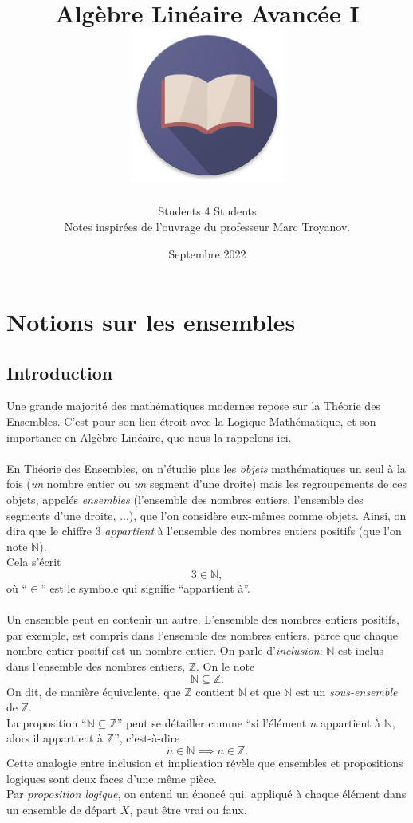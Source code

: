 \documentclass[oneside,12pt,french,table]{book}
\title{
    Algèbre Linéaire Avancée I \\ \vspace{0.5cm}
    \includegraphics[scale=0.5]{assets/imgs/S4S_logo.png}
}
\author{Students 4 Students \\
Notes inspirées de l'ouvrage du professeur Marc Troyanov.}
\date{Septembre 2022}
\theoremstyle{definition}
\theoremstyle{definition}
\theoremstyle{definition}
\begin{document}
\maketitle
\tableofcontents

\chapter{Notions sur les  ensembles}
\section{Introduction}
Une grande majorité des mathématiques modernes repose sur la Théorie des Ensembles. C'est pour son lien étroit avec la Logique Mathématique, et son importance en Algèbre Linéaire, que nous la rappelons ici. \\
\\
En Théorie des Ensembles, on n'étudie plus les \textit{objets} mathématiques un seul à la fois (\textit{un} nombre entier ou \textit{un} segment d'une droite) mais les regroupements de ces objets, appelés \textit{ensembles} (l'ensemble des nombres entiers, l'ensemble des segments d'une droite, ...), que l'on considère eux-mêmes comme objets. Ainsi, on dira que le chiffre 3 \textit{appartient} à l'ensemble des nombres entiers positifs (que l'on note $\mathbb{N}$). \\
Cela s'écrit $$3 \in \mathbb{N},$$
où ``$\in$'' est le symbole qui signifie ``appartient à''. \\
\\
Un ensemble peut en contenir un autre. L'ensemble des nombres entiers positifs, par exemple, est compris dans l'ensemble des nombres entiers, parce que chaque nombre entier positif est un nombre entier. On parle d'\textit{inclusion}: $\mathbb{N}$ est inclus dans l'ensemble des nombres entiers, $\mathbb{Z}$. On le note
$$\mathbb{N} \subseteq \mathbb{Z}.$$
On dit, de manière équivalente, que $\mathbb{Z}$ contient $\mathbb{N}$ et que $\mathbb{N}$ est un \textit{sous-ensemble} de $\mathbb{Z}$.\\ La proposition ``$\mathbb{N} \subseteq \mathbb{Z}$'' peut se détailler comme ``si l'élément $n$ appartient à $\mathbb{N}$, alors il appartient à $\mathbb{Z}$'', c'est-à-dire $$n \in \mathbb{N} \implies n \in \mathbb{Z}.$$
Cette analogie entre inclusion et implication révèle que ensembles et propositions logiques sont deux faces d'une même pièce. \\
Par \textit{proposition logique}, on entend un énoncé qui, appliqué à chaque élément dans un ensemble de départ $X$, peut être vrai ou faux. \\ \\
\end{document}

